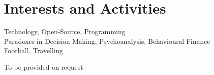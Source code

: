 \documentclass[letterpaper,11pt]{article}
\begin{document}
\section{Interests and Activities}
Technology, Open-Source, Programming\\
Paradoxes in Decision Making, Psychoanalysis, Behavioural Finance\\
Football, Travelling



\begin{description}


\item[To be provided on request]{}
%
%		
\end{description}
\end{document}
